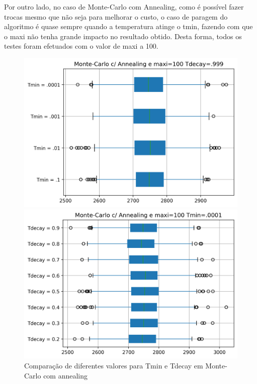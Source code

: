 \documentclass[a4paper]{report}
\begin{document}
Por outro lado, no caso de Monte-Carlo com Annealing, como é possível fazer
trocas mesmo que não seja para melhorar o custo, o caso de paragem do algoritmo
é quase sempre quando a temperatura atinge o tmin, fazendo com que o maxi não
tenha grande impacto no resultado obtido. Desta forma, todos os testes foram
efetuados com o valor de maxi a 100.

\begin{figure}[h]
\centering
\begin{minipage}{.5\textwidth}
  \centering
  \includegraphics[width=.95\linewidth]{images/graph_comp_tmin_sa.png}
\end{minipage}%
\begin{minipage}{.5\textwidth}
  \centering
  \includegraphics[width=.95\linewidth]{images/graph_comp_tdecay_sa.png}
\end{minipage}
    \caption{Comparação de diferentes valores para Tmin e Tdecay em Monte-Carlo com annealing}
\end{figure}
\end{document}

